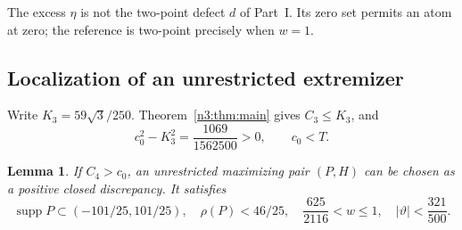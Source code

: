\documentclass[11pt,a4paper]{article}
\numberwithin{equation}{section}
\newtheorem{lemma}[theorem]{Lemma}
\theoremstyle{definition}
\theoremstyle{remark}
\DeclareMathOperator{\supp}{supp}
\begin{document}
The excess $\eta$ is not the two-point defect $d$ of Part~I.
Its zero set permits an atom at zero; the reference is two-point
precisely when $w=1$.

\subsection{Localization of an unrestricted extremizer}
Write $K_3=59\sqrt3/250$. Theorem~\ref{n3:thm:main} gives
$C_3\le K_3$, and
\[
 c_0^2-K_3^2=\frac{1069}{1562500}>0,\qquad c_0<T.
\]

\begin{lemma}\label{n4all:lem:owner}
If $C_4>c_0$, an unrestricted maximizing pair $(P,H)$ can be chosen
as a positive closed discrepancy. It satisfies
\begin{equation}\label{n4all:eq:owner-class}
 \supp P\subset(-101/25,101/25),\quad
 \rho(P)<46/25,\quad
 \frac{625}{2116}<w\le1,\quad |\vartheta|<\frac{321}{500}.
\end{equation}
\end{lemma}
\end{document}
